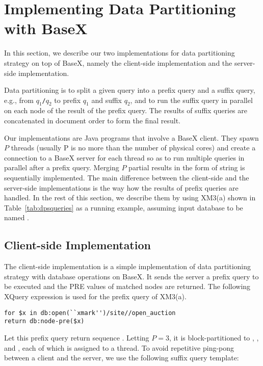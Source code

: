 \section{Implementing Data Partitioning with BaseX}
\label{sect:dpsimpl}

In this section, we describe our two implementations for data partitioning
strategy on top of BaseX, namely the client-side implementation and the
server-side implementation.

Data partitioning is to split a given query into a prefix query and a suffix
query, e.g., from \texttt{$q_1$/$q_2$} to prefix $q_1$ and suffix $q_2$, and to
run the suffix query in parallel on each node of the result of the prefix query.
The results of suffix queries are concatenated in document order to form the 
final result.

Our implementations are Java programs that involve a BaseX client. They spawn
$P$ threads (usually P is no more than the number of physical cores) and  create
a connection to a BaseX server for each thread so as to run multiple queries in
parallel after a prefix query. Merging $P$ partial results in the form of string
is sequentially implemented. The main difference between the client-side and the
server-side implementations is the way how the results of prefix queries are
handled. In the rest of this section, we describe them by using XM3(a) shown in
Table~\ref{tab:dpsqueries} as a running example, assuming input database to be
named .

\subsection{Client-side Implementation}

The client-side implementation is a simple implementation of data partitioning
strategy with database operations on BaseX. It sends the server a prefix query
to be executed and the PRE values of matched nodes are returned. The following
XQuery expression is used for the prefix query of XM3(a).

\begin{lstlisting}
for $x in db:open(``xmark'')/site//open_auction
return db:node-pre($x)
\end{lstlisting}

Let this prefix query return sequence .  Letting
$P = 3$, it is block-partitioned to , , and , each of which is assigned to a thread. To avoid repetitive ping-pong
between a client and the server, we use the following suffix query template:

